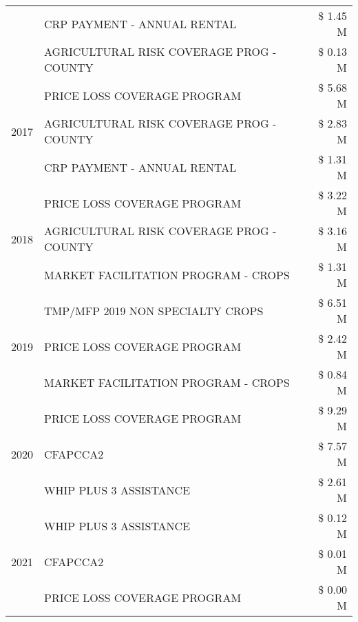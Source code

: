 \begin{tabular}{llr}
 & CRP PAYMENT - ANNUAL RENTAL & \$ 1.45 M \\
 & AGRICULTURAL RISK COVERAGE PROG - COUNTY & \$ 0.13 M \\
\cline{1-3}
\multirow[t]{3}{*}{2017} & PRICE LOSS COVERAGE PROGRAM & \$ 5.68 M \\
 & AGRICULTURAL RISK COVERAGE PROG - COUNTY & \$ 2.83 M \\
 & CRP PAYMENT - ANNUAL RENTAL & \$ 1.31 M \\
\cline{1-3}
\multirow[t]{3}{*}{2018} & PRICE LOSS COVERAGE PROGRAM & \$ 3.22 M \\
 & AGRICULTURAL RISK COVERAGE PROG - COUNTY & \$ 3.16 M \\
 & MARKET FACILITATION PROGRAM - CROPS & \$ 1.31 M \\
\cline{1-3}
\multirow[t]{3}{*}{2019} & TMP/MFP 2019 NON SPECIALTY CROPS & \$ 6.51 M \\
 & PRICE LOSS COVERAGE PROGRAM & \$ 2.42 M \\
 & MARKET FACILITATION PROGRAM - CROPS & \$ 0.84 M \\
\cline{1-3}
\multirow[t]{3}{*}{2020} & PRICE LOSS COVERAGE PROGRAM & \$ 9.29 M \\
 & CFAPCCA2 & \$ 7.57 M \\
 & WHIP PLUS 3 ASSISTANCE & \$ 2.61 M \\
\cline{1-3}
\multirow[t]{3}{*}{2021} & WHIP PLUS 3 ASSISTANCE & \$ 0.12 M \\
 & CFAPCCA2 & \$ 0.01 M \\
 & PRICE LOSS COVERAGE PROGRAM & \$ 0.00 M \\
\cline{1-3}
\bottomrule
\end{tabular}
